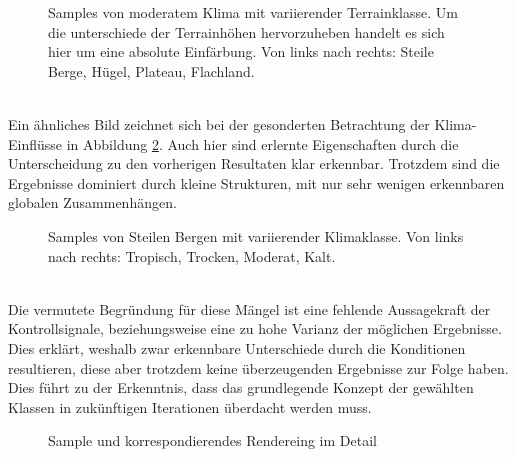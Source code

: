 \begin{figure}[htbp]
    \centering
    \caption{Samples von moderatem Klima mit variierender Terrainklasse. Um die unterschiede der Terrainhöhen hervorzuheben handelt es sich hier um eine absolute Einfärbung. Von links nach rechts: Steile Berge, Hügel, Plateau, Flachland.}
    \label{fig:unc_terrain}
\end{figure} \\
Ein ähnliches Bild zeichnet sich bei der gesonderten Betrachtung der Klima-Einflüsse in Abbildung \ref{fig:unc_climate}. Auch hier sind erlernte Eigenschaften durch die Unterscheidung zu den vorherigen Resultaten klar erkennbar. Trotzdem sind die Ergebnisse dominiert durch kleine Strukturen, mit nur sehr wenigen erkennbaren globalen Zusammenhängen.
\begin{figure}[htbp]
    \centering
    \caption{Samples von Steilen Bergen mit variierender Klimaklasse. Von links nach rechts: Tropisch, Trocken, Moderat, Kalt.}
    \label{fig:unc_climate}
\end{figure} \\
Die vermutete Begründung für diese Mängel ist eine fehlende Aussagekraft der Kontrollsignale, beziehungsweise eine zu hohe Varianz der möglichen Ergebnisse. Dies erklärt, weshalb zwar erkennbare Unterschiede durch die Konditionen resultieren, diese aber trotzdem keine überzeugenden Ergebnisse zur Folge haben. Dies führt zu der Erkenntnis, dass das grundlegende Konzept der gewählten Klassen in zukünftigen Iterationen überdacht werden muss.
\begin{figure}[htbp]
    \centering
    \caption{Sample und korrespondierendes Rendereing im Detail}
    \label{fig:unc_climate_renders}
\end{figure}


